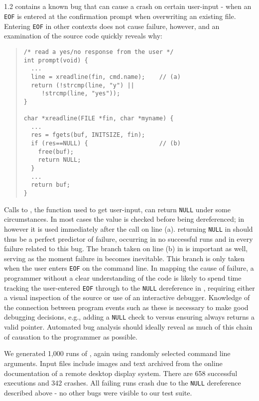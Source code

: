 \subsection{\large\textbf{}}
\label{sec-ccrypt}
 1.2 contains a known bug that can cause a crash on certain user-input - when an \texttt{EOF} is entered at the confirmation prompt when overwriting an existing file.  Entering \texttt{EOF} in other contexts does not cause failure, however, and an examination of the source code quickly reveals why:
\begin{quote}
\small
\begin{verbatim}
/* read a yes/no response from the user */
int prompt(void) {
  ...
  line = xreadline(fin, cmd.name);    // (a)
  return (!strcmp(line, "y") ||
     !strcmp(line, "yes"));
}

char *xreadline(FILE *fin, char *myname) {
  ...
  res = fgets(buf, INITSIZE, fin);
  if (res==NULL) {                    // (b)
    free(buf);
    return NULL;
  }
  ...
  return buf;
}
\end{verbatim}
\end{quote}

Calls to , the function used to get user-input, can return \texttt{NULL} under some circumstances.  In most cases the value is checked before being dereferenced; in  however it is used immediately after the call on line (a).   returning \texttt{NULL} in  should thus be a perfect predictor of failure, occurring in no successful runs and in every failure related to this bug.  The branch taken on line (b) in  is important as well, serving as the moment failure in  becomes inevitable.  This branch is only taken when the user enters \texttt{EOF} on the command line.  In mapping the cause of failure, a programmer without a clear understanding of the code is likely to spend time tracking the user-entered \texttt{EOF} through  to the \texttt{NULL} dereference in , requiring either a visual inspection of the source or use of an interactive debugger.  Knowledge of the connection between program events such as these is necessary to make good debugging decisions, e.g., adding a \texttt{NULL} check to  versus ensuring  always returns a valid pointer.  Automated bug analysis should ideally reveal as much of this chain of causation to the programmer as possible.

We generated 1,000 runs of , again using randomly selected command line arguments.  Input files include images and text archived from the online documentation of a remote desktop display system.  There are 658 successful executions and 342 crashes.  All failing runs crash due to the \texttt{NULL} dereference described above - no other bugs were visible to our test suite.


